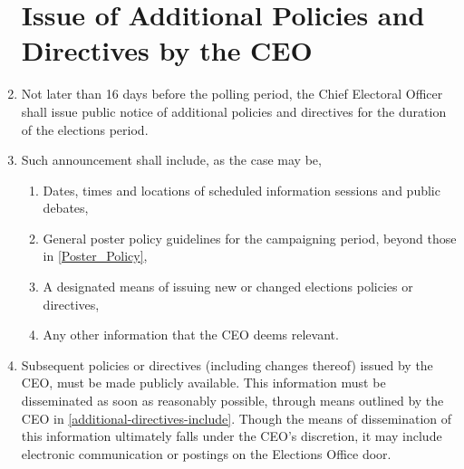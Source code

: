 \documentclass[oneside]{book}
\begin{document}
\begin{enumerate}
\section{\label{1_Issue_of_Additional_Policies_and_Directives_by_the_CEO}Issue
of Additional Policies and Directives by the CEO }
\item Not later than 16 days before the polling period, the Chief Electoral
Officer shall issue public notice of additional policies and directives
for the duration of the elections period. 
\item \label{additional-directives-include}Such announcement shall include,
as the case may be, 

\begin{enumerate}
\item Dates, times and locations of scheduled information sessions and public
debates, 
\item General poster policy guidelines for the campaigning period, beyond
those in \autoref{Poster_Policy}, 
\item A designated means of issuing new or changed elections policies or
directives, 
\item Any other information that the CEO deems relevant. 
\end{enumerate}
\item Subsequent policies or directives (including changes thereof) issued
by the CEO, must be made publicly available. This information must
be disseminated as soon as reasonably possible, through means outlined
by the CEO in \autoref{additional-directives-include}. Though
the means of dissemination of this information ultimately falls under
the CEO's discretion, it may include electronic communication or postings
on the Elections Office door. 


\end{enumerate}
\end{document}

